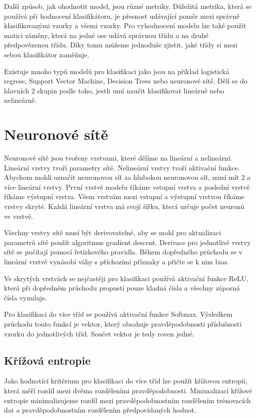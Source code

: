 \documentclass[FM,BP]{tulthesis}
\begin{document}
Další způsob, jak ohodnotit model, jsou různé metriky. Důležitá metrika, která se používá při hodnocení klasifikátoru, je přesnost udávající poměr mezi správně klasifikovanými vzorky a všemi vzorky. Pro vyhodnocení modelu lze také použít matici záměny, která na jedné ose udává správnou třídu a na druhé předpovězenou třídu. Díky tomu můžeme jednoduše zjistit, jaké třídy si mezi sebou klasifikátor zaměňuje.

Existuje mnoho typů modelů pro klasifikaci jako jsou na příklad logistická regrese, Support Vector Machine, Decision Trees nebo neuronové sítě. \cite{fumo_2017} Dělí se do hlavních 2 skupin podle toho, jestli umí naučit klasifikovat lineárně nebo nelineárně. 

\section{Neuronové sítě}
Neuronové sítě jsou tvořeny vrstvami, které dělíme na lineární a nelineární. Lineární vrstvy tvoří parametry sítě. Nelineární vrstvy tvoří aktivační funkce. Abychom mohli označit neuronovou síť za hlubokou neuronovou síť, musí mít 2 a více lineární vrstvy. První vrstvě modelu říkáme vstupní vrstva a poslední vrstvě říkáme výstupní vrstva. Všem vrstvám mezi vstupní a výstupní vrstvou říkáme vrstvy skryté. Každá lineární vrstva má svojí šířku, která určuje počet neuronů ve vrstvě.

Všechny vrstvy sítě musí být derivovatelné, aby se mohl pro aktualizaci parametrů sítě použít algoritmus gradient descent. Derivace pro jednotlivé vrstvy sítě se počítají pomocí řetízkového pravidla. Během dopředného průchodu se v lineární vrstvě vynásobí váhy s příchozími příznaky a přičte se k nim bias.

Ve skrytých vrstvách se nejčastěji pro klasifikaci používá aktivační funkce ReLU, která při dopředném průchodu propustí pouze kladná čísla a všechny záporná čísla vynuluje.

Pro klasifikaci do více tříd se používá aktivační funkce Softmax. Výsledkem průchodu touto funkcí je vektor, který obsahuje pravděpodobnosti příslušnosti vzorku do jednotlivých tříd. Součet vektor je tedy roven jedné.

\subsection{Křížová entropie}
Jako hodnotící kritérium pro klasifikaci do více tříd lze použít křížovou entropii, která měří rozdíl mezi dvěma rozděleními pravděpodobnosti. Minimalizací křížové entropie minimalizujeme rozdíl mezi pravděpodobnostním rozdělením trénovacích dat a pravděpodobnostním rozdělením předpovídaných hodnot.\cite{brownlee_2020}
\end{document}

